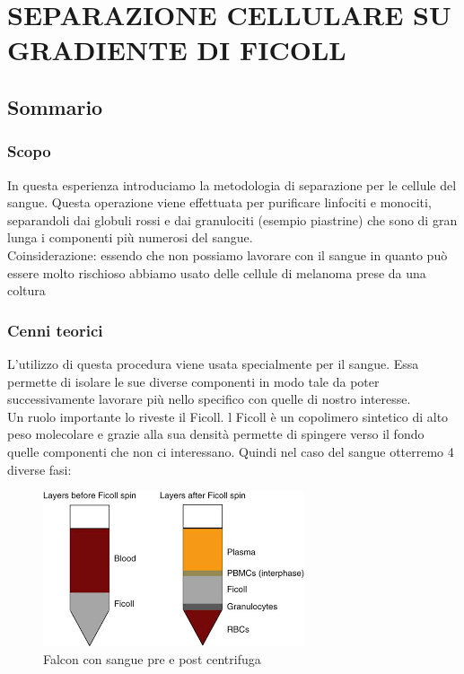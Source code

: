 \section{\LARGE{SEPARAZIONE CELLULARE SU GRADIENTE DI FICOLL}}

\vspace{0.6cm}

\subsection{Sommario}

\subsubsection{Scopo}


In questa esperienza introduciamo la metodologia di separazione per le cellule del sangue. Questa operazione viene effettuata per purificare linfociti e monociti, separandoli dai globuli rossi e dai granulociti (esempio piastrine) che sono di gran lunga i componenti più numerosi del sangue.\\
Coinsiderazione: essendo che non possiamo lavorare con il sangue in quanto può essere molto rischioso abbiamo usato delle cellule di melanoma prese da una coltura


\subsubsection{Cenni teorici}
L'utilizzo di questa procedura viene usata specialmente per il sangue. Essa permette di isolare le sue diverse componenti in modo tale da poter successivamente lavorare più nello specifico con quelle di nostro interesse.\\
Un ruolo importante lo riveste il Ficoll. l Ficoll è un copolimero sintetico di alto peso molecolare e grazie alla sua densità permette di spingere verso il fondo quelle componenti che non ci interessano. Quindi nel caso del sangue otterremo 4 diverse fasi:
\begin{figure}[H]
    \centering
    \includegraphics{./immagini/Ficoll_sangue.png}
    \caption{Falcon con sangue pre e post centrifuga}
\end{figure}



